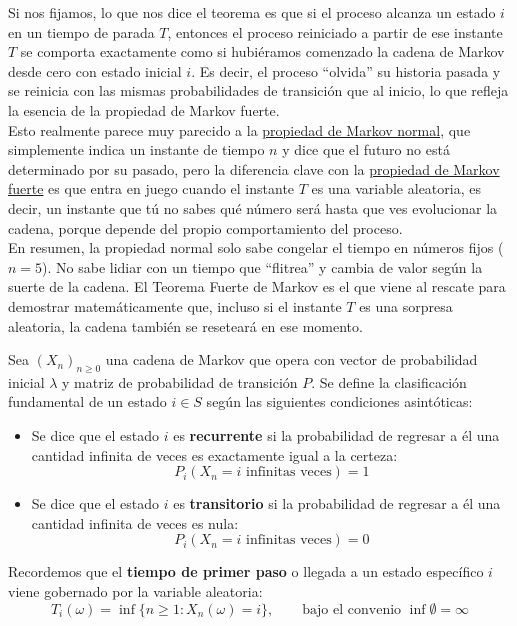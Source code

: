 \documentclass[10pt]{book}
\begin{document}
\begin{observacion}
    Si nos fijamos, lo que  nos dice el teorema es que si el proceso alcanza un estado $i$ en un tiempo de parada $T$, entonces el proceso reiniciado a partir de ese instante $T$ se comporta exactamente como si hubiéramos comenzado la cadena de Markov desde cero con estado inicial $i$. Es decir, el proceso ``olvida'' su historia pasada y se reinicia con las mismas probabilidades de transición que al inicio, lo que refleja la esencia de la propiedad de Markov fuerte. \\

    \noindent
    Esto realmente parece muy parecido a la \underline{propiedad de Markov normal}, que simplemente indica un instante de tiempo $n$ y dice que el futuro no está determinado por su pasado, pero la diferencia clave con la \underline{propiedad de Markov fuerte} es que entra en juego cuando el instante $T$ es una variable aleatoria, es decir, un instante que tú no sabes qué número será hasta que ves evolucionar la cadena, porque depende del propio comportamiento del proceso. \\

    \noindent
    En resumen, la propiedad normal solo sabe congelar el tiempo en números fijos ($n=5$). No sabe lidiar con un tiempo que ``flitrea'' y cambia de valor según la suerte de la cadena. El Teorema Fuerte de Markov es el que viene al rescate para demostrar matemáticamente que, incluso si el instante $T$ es una sorpresa aleatoria, la cadena también se reseteará en ese momento.
\end{observacion}


\begin{definicion}
Sea $(X_n)_{n \geq 0}$ una cadena de Markov que opera con vector de probabilidad inicial $\lambda$ y matriz de probabilidad de transición $P$. Se define la clasificación fundamental de un estado $i \in S$ según las siguientes condiciones asintóticas:
\begin{itemize}
    \item Se dice que el estado $i$ es \textbf{recurrente} si la probabilidad de regresar a él una cantidad infinita de veces es exactamente igual a la certeza:
    \[
    P_i(X_n = i \text{ infinitas veces}) = 1
    \]
    \item Se dice que el estado $i$ es \textbf{transitorio} si la probabilidad de regresar a él una cantidad infinita de veces es nula:
    \[
    P_i(X_n = i \text{ infinitas veces}) = 0
    \]
\end{itemize}

\end{definicion}
\noindent
Recordemos que el \textbf{tiempo de primer paso} o llegada a un estado específico $i$ viene gobernado por la variable aleatoria: 
\[
T_i(\omega) = \inf\{n \geq 1 : X_n(\omega) = i\}, \qquad \text{bajo el convenio } \inf \emptyset = \infty
\]
\end{document}
